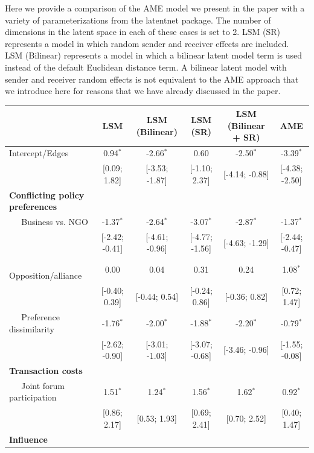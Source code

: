 \documentclass[12pt,pdflatex]{elsarticle}
\newcommand{\pkg}[1]{{\fontseries{b}\selectfont #1}}
\begin{document}
Here we provide a comparison of the AME model we present in the paper with a variety of parameterizations from the \pkg{latentnet} package. The number of dimensions in the latent space in each of these cases is set to 2. LSM (SR) represents a model in which random sender and receiver effects are included. LSM (Bilinear) represents a model in which a bilinear latent model term is used instead of the default Euclidean distance term. A bilinear latent model with sender and receiver random effects is not equivalent to the AME approach that we introduce here for reasons that we have already discussed in the paper. 

\begin{table}[ht]
\centering
\begingroup\tiny
\begin{tabular}{lccccc}
   & LSM & LSM (Bilinear) & LSM (SR) & LSM (Bilinear + SR) & AME \\ 
  \hline
\hline
Intercept/Edges & 0.94$^{\ast}$ & -2.66$^{\ast}$ & 0.60 & -2.50$^{\ast}$ & -3.39$^{\ast}$ \\ 
   & [0.09; 1.82] & [-3.53; -1.87] & [-1.10; 2.37] & [-4.14; -0.88] & [-4.38; -2.50] \\ 
  \textbf{Conflicting policy preferences} &  &  &  &  &  \\ 
  $\;\;\;\;$ Business vs. NGO & -1.37$^{\ast}$ & -2.64$^{\ast}$ & -3.07$^{\ast}$ & -2.87$^{\ast}$ & -1.37$^{\ast}$ \\ 
   & [-2.42; -0.41] & [-4.61; -0.96] & [-4.77; -1.56] & [-4.63; -1.29] & [-2.44; -0.47] \\ 
  $\;\;\;\;$ Opposition/alliance & 0.00 & 0.04 & 0.31 & 0.24 & 1.08$^{\ast}$ \\ 
   & [-0.40; 0.39] & [-0.44; 0.54] & [-0.24; 0.86] & [-0.36; 0.82] & [0.72; 1.47] \\ 
  $\;\;\;\;$ Preference dissimilarity & -1.76$^{\ast}$ & -2.00$^{\ast}$ & -1.88$^{\ast}$ & -2.20$^{\ast}$ & -0.79$^{\ast}$ \\ 
   & [-2.62; -0.90] & [-3.01; -1.03] & [-3.07; -0.68] & [-3.46; -0.96] & [-1.55; -0.08] \\ 
  \textbf{Transaction costs} &  &  &  &  &  \\ 
  $\;\;\;\;$ Joint forum participation & 1.51$^{\ast}$ & 1.24$^{\ast}$ & 1.56$^{\ast}$ & 1.62$^{\ast}$ & 0.92$^{\ast}$ \\ 
   & [0.86; 2.17] & [0.53; 1.93] & [0.69; 2.41] & [0.70; 2.52] & [0.40; 1.47] \\ 
  \textbf{Influence} &  &  &  &  &  \\ 

\end{tabular}
\end{table}
\end{document}
